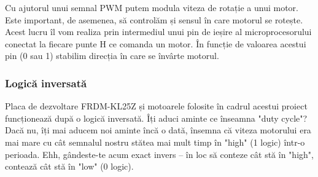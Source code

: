 Cu ajutorul unui semnal PWM putem modula viteza de rotație a unui motor. Este important, de asemenea, să controlăm și sensul în care motorul se rotește. Acest lucru îl vom realiza prin intermediul unui pin de ieșire al microprocesorului conectat la fiecare punte H ce comanda un motor. În funcție de valoarea acestui pin (0 sau 1) stabilim direcția în care se învârte motorul.

\subsubsection{Logică inversată}

Placa de dezvoltare FRDM-KL25Z și motoarele folosite în cadrul acestui proiect funcționează după o logică inversată. Îți aduci aminte ce înseamna "duty cycle"? Dacă nu, îți mai aducem noi aminte încă o dată, însemna că viteza motorului era mai mare cu cât semnalul nostru stătea mai mult timp în "high" (1 logic) într-o perioada. Ehh, gândeste-te acum exact invers – în loc să conteze cât stă în "high", contează cât stă în "low" (0 logic).

